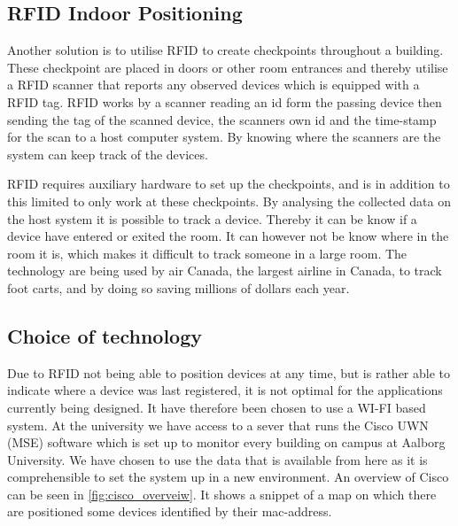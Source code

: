 \subsection{RFID Indoor Positioning}
Another solution is to utilise RFID to create checkpoints throughout a building. These checkpoint are placed in doors or other room entrances and thereby utilise a RFID scanner that reports any observed devices which is equipped with a RFID tag\cite{indoor_bin}. 
RFID works by a scanner reading an id form the passing device then sending the tag of the scanned device, the scanners own id and the time-stamp for the scan to a host computer system. By knowing where the scanners are the system can keep track of the devices\cite{RFIDjournal}.

RFID requires auxiliary hardware to set up the checkpoints, and is in addition to this limited to only work at these checkpoints. By analysing the collected data on the host system it is possible to track a device. Thereby it can be know if a device have entered or exited the room. It can however not be know where in the room it is, which makes it difficult to track someone in a large room.
The technology are being used by air Canada, the largest airline in Canada, to track foot carts, and by doing so saving millions of dollars each year\cite{RFIDjournal}.




\subsection{Choice of technology}\label{subsec:cisco}
Due to RFID not being able to position devices at any time, but is rather able to indicate where a device was last registered, it is not optimal for the applications currently being designed. It have therefore been chosen to use a WI-FI based system.
At the university we have access to a sever that runs the Cisco UWN (MSE) software which is set up to monitor every building on campus at Aalborg University. We have chosen to use the data that is available from here as it is comprehensible to set the system up in a new environment. An overview of Cisco can be seen in \cref{fig:cisco_overveiw}. It shows a snippet of a map on which there are positioned some devices identified by their mac-address.

